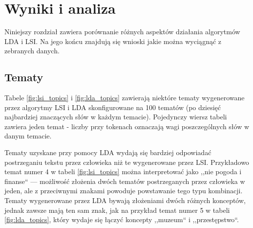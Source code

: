\documentclass[11pt,a4paper]{article}
\begin{document}
\section{Wyniki i analiza}

Niniejszy rozdział zawiera porównanie różnych aspektów działania algorytmów LDA
i LSI. Na jego końcu znajdują się wnioski jakie można wyciągnąć z zebranych
danych.

\subsection{Tematy}

Tabele \ref{fig:lsi_topics} i \ref{fig:lda_topics} zawierają niektóre tematy
wygenerowane przez algorytmy LSI i LDA skonfigurowane na 100 tematów (po
dziesięć najbardziej znaczących słów w każdym temacie). Pojedynczy wiersz
tabeli zawiera jeden temat - liczby przy tokenach oznaczają wagi poszczególnych
słów w danym temacie.

Tematy uzyskane przy pomocy LDA wydają się bardziej odpowiadać postrzeganiu
tekstu przez człowieka niż te wygenerowane przez LSI.  Przykładowo temat numer 4 w tabeli
\ref{fig:lsi_topics} można interpretować jako ,,nie pogoda i finanse`` ---
możliwość złożenia dwóch tematów postrzeganych przez człowieka w jeden, ale z
przeciwnymi znakami powoduje powstawanie tego typu kombinacji. Tematy wygenerowane
przez LDA bywają złożeniami dwóch różnych konceptów, jednak zawsze mają ten sam znak,
jak na przykład temat numer 5 w tabeli \ref{fig:lda_topics}, który wydaje się łączyć
koncepty ,,muzeum`` i ,,przestępstwo``.
\end{document}
